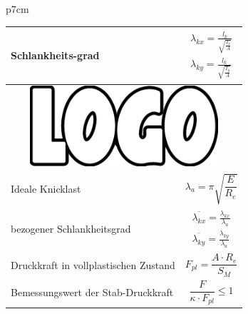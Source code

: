 \documentclass[11pt,a4paper,twocolumn]{scrartcl}
\newcommand{\ceins}{2.5cm}
\newcommand{\czwei}{5cm}
\newcommand{\cges}{7cm}
\begin{document}
\begin{tabular}{p{\cges}}
	\arrayrulecolor{green}
	\begin{tabular}{|p{\ceins}|p{\czwei}|}	\hline
		Schlankheits-grad&\begin{gather*}\lambda_{kx}=\frac{l_k}{\sqrt{\frac{I_x}{A}}}\\\lambda_{ky}=\frac{l_k}{\sqrt{\frac{I_y}{A}}}\end{gather*}\\\hline
	\multicolumn{2}{|c|}{\includegraphics[width=\cges]{logo}}\\\hline
	Ideale Knicklast&$$\lambda_{a}=\pi\sqrt{\frac{E}{R_e}}$$\\\hline
	bezogener Schlankheitsgrad&\begin{gather*}\overline{\lambda_{kx}}=\frac{\lambda_{kx}}{\lambda_{a}}\\\overline{\lambda_{ky}}=\frac{\lambda_{ky}}{\lambda_{a}}\end{gather*}\\\hline
		Druckkraft in vollplastischen Zustand&$$F_{pl}=\frac{A\cdot R_e}{S_M}$$\\\hline
		Bemessungswert der Stab-Druckkraft&$$\frac{F}{\kappa\cdot F_{pl}}\leq1$$\\\hline
\end{tabular}	
	

\end{tabular}
\end{document}
